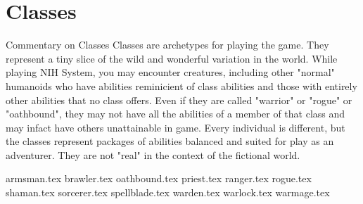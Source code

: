 \chapter{Classes}
\label{ch:classes}

\begin{DndComment}{Commentary on Classes}
Classes are archetypes for playing the game. They represent a tiny slice of the wild and wonderful variation in the world. While playing NIH System, you may encounter creatures, including other "normal" humanoids who have abilities reminicient of class abilities and those with entirely other abilities that no class offers. Even if they are called "warrior" or "rogue" or "oathbound", they may not have all the abilities of a member of that class and may infact have others unattainable in game. Every individual is different, but the classes represent packages of abilities balanced and suited for play as an adventurer. They are not "real" in the context of the fictional world.
\end{DndComment}

{armsman.tex}
{brawler.tex}
{oathbound.tex}
{priest.tex}
{ranger.tex}
{rogue.tex}
{shaman.tex}
{sorcerer.tex}
{spellblade.tex}
{warden.tex}
{warlock.tex}
{warmage.tex}

